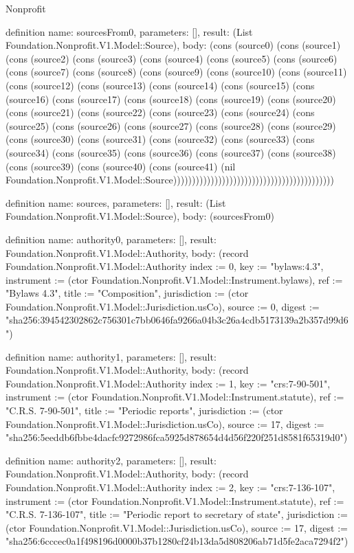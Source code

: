\begin{lexlean}{Nonprofit}
\begin{semanticmodule}
definition{
  name: sourcesFrom0,
  parameters: [],
  result: (List Foundation.Nonprofit.V1.Model::Source),
  body: (cons (source0) (cons (source1) (cons (source2) (cons (source3) (cons (source4) (cons (source5) (cons (source6) (cons (source7) (cons (source8) (cons (source9) (cons (source10) (cons (source11) (cons (source12) (cons (source13) (cons (source14) (cons (source15) (cons (source16) (cons (source17) (cons (source18) (cons (source19) (cons (source20) (cons (source21) (cons (source22) (cons (source23) (cons (source24) (cons (source25) (cons (source26) (cons (source27) (cons (source28) (cons (source29) (cons (source30) (cons (source31) (cons (source32) (cons (source33) (cons (source34) (cons (source35) (cons (source36) (cons (source37) (cons (source38) (cons (source39) (cons (source40) (cons (source41) (nil Foundation.Nonprofit.V1.Model::Source)))))))))))))))))))))))))))))))))))))))))))
}

definition{
  name: sources,
  parameters: [],
  result: (List Foundation.Nonprofit.V1.Model::Source),
  body: (sourcesFrom0)
}

definition{
  name: authority0,
  parameters: [],
  result: Foundation.Nonprofit.V1.Model::Authority,
  body: (record Foundation.Nonprofit.V1.Model::Authority {index := 0, key := "bylaws:4.3", instrument := (ctor Foundation.Nonprofit.V1.Model::Instrument.bylaws), ref := "Bylaws 4.3", title := "Composition", jurisdiction := (ctor Foundation.Nonprofit.V1.Model::Jurisdiction.usCo), source := 0, digest := "sha256:394542302862c756301c7bb0646fa9266a04b3c26a4cdb5173139a2b357d99d6"})
}

definition{
  name: authority1,
  parameters: [],
  result: Foundation.Nonprofit.V1.Model::Authority,
  body: (record Foundation.Nonprofit.V1.Model::Authority {index := 1, key := "crs:7-90-501", instrument := (ctor Foundation.Nonprofit.V1.Model::Instrument.statute), ref := "C.R.S. 7-90-501", title := "Periodic reports", jurisdiction := (ctor Foundation.Nonprofit.V1.Model::Jurisdiction.usCo), source := 17, digest := "sha256:5eeddb6fbbe4dacfc9272986fca5925d878654d4d56f220f251d8581f65319d0"})
}

definition{
  name: authority2,
  parameters: [],
  result: Foundation.Nonprofit.V1.Model::Authority,
  body: (record Foundation.Nonprofit.V1.Model::Authority {index := 2, key := "crs:7-136-107", instrument := (ctor Foundation.Nonprofit.V1.Model::Instrument.statute), ref := "C.R.S. 7-136-107", title := "Periodic report to secretary of state", jurisdiction := (ctor Foundation.Nonprofit.V1.Model::Jurisdiction.usCo), source := 17, digest := "sha256:6cccec0a1f498196d0000b37b1280cf24b13da5d808206ab71d5fe2aca7294f2"})
}


\end{semanticmodule}
\end{lexlean}
